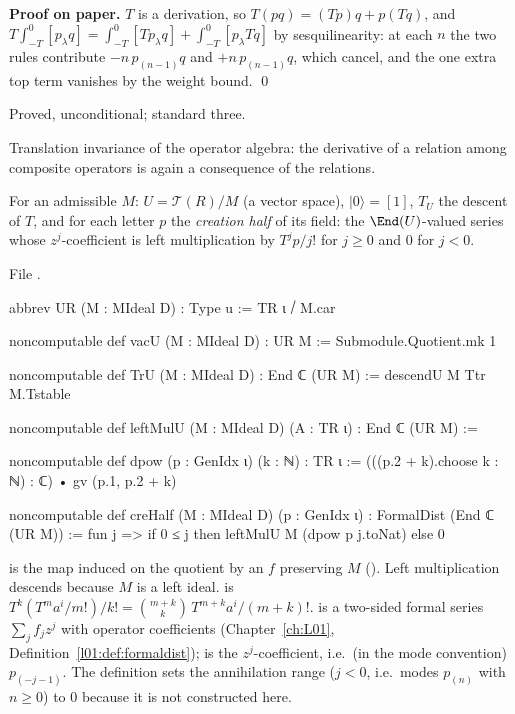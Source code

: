 \textbf{Proof on paper.} $T$ is a derivation, so $T(pq) = (Tp)q+p(Tq)$, and $T\int_{-T}^0[p_\lambda q] =
\int_{-T}^0[Tp_\lambda q]+\int_{-T}^0[p_\lambda Tq]$ by sesquilinearity: at each $n$ the two rules contribute $-n\,p_{(n-1)}q$ and
$+n\,p_{(n-1)}q$, which cancel, and the one extra top term vanishes by the weight bound. \qed

\begin{status}
Proved, unconditional; standard three.
\end{status}

\begin{physics}
Translation invariance of the operator algebra: the derivative of a relation among composite operators is again a
consequence of the relations.
\end{physics}

\begin{definition}[The quotient $U = \mathcal T(R)/M$, vacuum, translation, creation half]\label{l11:def:UR}
For an admissible $M$: $U = \mathcal T(R)/M$ (a vector space), $|0\rangle = [1]$, $T_U$ the descent of $T$, and for each letter $p$
the \emph{creation half} of its field: the $\End(U)$-valued series whose $z^j$-coefficient is left multiplication by
$T^j p/j!$ for $j\ge0$ and $0$ for $j<0$.
\end{definition}
\noindent File .
\begin{leancode}
abbrev UR (M : MIdeal D) : Type u := TR ι ⧸ M.car

noncomputable def vacU (M : MIdeal D) : UR M := Submodule.Quotient.mk 1

noncomputable def TrU (M : MIdeal D) : End ℂ (UR M) := descendU M Ttr M.Tstable

noncomputable def leftMulU (M : MIdeal D) (A : TR ι) : End ℂ (UR M) :=

noncomputable def dpow (p : GenIdx ι) (k : ℕ) : TR ι :=
  (((p.2 + k).choose k : ℕ) : ℂ) • gv (p.1, p.2 + k)

noncomputable def creHalf (M : MIdeal D) (p : GenIdx ι) : FormalDist (End ℂ (UR M)) :=
  fun j => if 0 ≤ j then leftMulU M (dpow p j.toNat) else 0
\end{leancode}

\begin{dictionary}
 is the map induced on the quotient by an $f$ preserving $M$ (). Left
multiplication descends because $M$ is a left ideal.  is $T^k(T^ma^i/m!)/k! = \binom{m+k}{k}\,T^{m+k}a^i/(m+k)!$.
 is a two-sided formal series $\sum_jf_jz^j$ with operator coefficients
(Chapter~\ref{ch:L01}, Definition~\ref{l01:def:formaldist});  is the $z^j$-coefficient, i.e.\ (in the mode
convention) $p_{(-j-1)}$. The definition sets the annihilation range ($j<0$, i.e.\ modes $p_{(n)}$ with $n\ge0$) to $0$
because it is not constructed here.
\end{dictionary}

